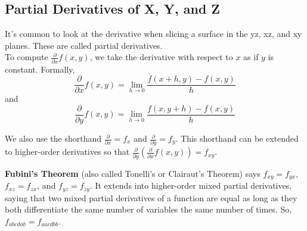 \subsection{Partial Derivatives of X, Y, and Z}
\noindent
It's common to look at the derivative when slicing a surface in the yz, xz, and xy planes. These are called partial derivatives.\\

\noindent
To compute $\frac{\partial}{\partial x}{f(x,y)}$, we take the derivative with respect to $x$ as if $y$ is constant. Formally,
\begin{equation*}
	\frac{\partial}{\partial x}f(x,y) = \lim_{h \to 0}{\frac{f(x+h,y)-f(x,y)}{h}}
\end{equation*} 
and 
\begin{equation*}
	\frac{\partial}{\partial y}f(x,y) = \lim_{h \to 0}{\frac{f(x,y+h)-f(x,y)}{h}}
\end{equation*}

\noindent
We also use the shorthand $\frac{\partial}{\partial x}=f_x$ and $\frac{\partial}{\partial y}=f_y$. This shorthand can be extended to higher-order derivatives so that $\frac{\partial}{\partial y}\left(\frac{\partial}{\partial x}f(x,y)\right)=f_{xy}$.

\noindent
\textbf{Fubini's Theorem} (also called Tonelli's or Clairaut's Theorem) says $f_{xy} = f_{yx}$, $f_{xz} = f_{zx}$, and $f_{yz} = f_{zy}$. It extends into higher-order mixed partial derivatives, saying that two mixed partial derivatives of a function are equal as long as they both differentiate the same number of variables the same number of times. So, $f_{abcdab} = f_{aacdbb}$.